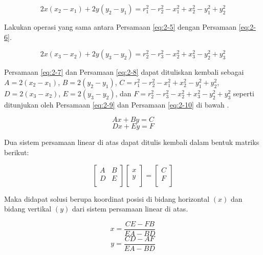 \begin{equation}
	2x \left(x_2-x_1\right) + 2y \left(y_2 - y_1\right) = r_1^2 - r_2^2 - x_1^2 + x_2^2- y_1^2 + y_2^2
	\label{eq:2-7}
\end{equation}

Lakukan operasi yang sama antara Persamaan  \ref{eq:2-5} dengan Persamaan \ref{eq:2-6}.

\begin{equation}
	2x \left(x_3 -x_2\right) + 2y \left(y_3 - y_2\right) = r_2^2 - r_3^2 - x_2^2 + x_3^2- y_2^2 + y_3^2
	\label{eq:2-8}
\end{equation}

Persamaan \ref{eq:2-7} dan Persamaan \ref{eq:2-8} dapat dituliskan kembali sebagai $A = 2 \left(x_2-x_1\right)$, $B = 2 \left(y_2 - y_1\right)$, $C = r_1^2 - r_2^2 - x_1^2 + x_2^2- y_1^2 + y_2^2$, $D = 2 \left(x_3 -x_2\right)$, $E = 2 \left(y_3 - y_2\right) $, dan $F= r_2^2 - r_3^2 - x_2^2 + x_3^2- y_2^2 + y_3^2$ seperti ditunjukan oleh Persamaan \ref{eq:2-9} dan Persamaan \ref{eq:2-10} di bawah .

\begin{equation}
	Ax + By = C
	\label{eq:2-9}
\end{equation}
\begin{equation}
	Dx + Ey = F
	\label{eq:2-10}
\end{equation}

Dua sistem persamaan linear di atas dapat ditulis kembali dalam bentuk matriks berikut:

\begin{equation}
	\begin{bmatrix}
		A & B \\
		D & E \\
	\end{bmatrix}
	\begin{bmatrix}
		x \\
		y\\
	\end{bmatrix} = 
	\begin{bmatrix}
		C \\
		F \\
	\end{bmatrix}
	\label{eq:2-11}
\end{equation}

Maka didapat solusi berupa koordinat posisi di bidang horizontal $\left(x\right)$ dan bidang vertikal $\left(y\right)$ dari sistem persamaan linear di atas.

\begin{equation}
	x = \frac{CE-FB}{EA-BD}
	\label{eq:2-12}
\end{equation}
\begin{equation}
	y = \frac{CD-AF}{EA-BD}
	\label{eq:2-13}
\end{equation}


